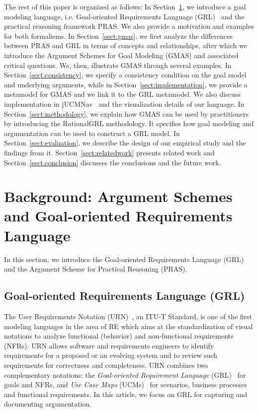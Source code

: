 \documentclass[11.5pt,two column]{llncs}
\begin{document}
The rest of this paper is organized as follows: In Section~\ref{sect:background}, we introduce a goal modeling language, i.e. Goal-oriented Requirements Language (GRL)~\cite{} and the practical reasoning framework PRAS. We also provide a motivation and examples for both formalisms. In Section~\ref{sect:gmas}, we first analyze the differences between PRAS and GRL in terms of concepts and relationships, after which we introduce the Argument Schemes for Goal Modeling (GMAS) and associated critical questions. We, then, illustrate GMAS through several examples. In Section~\ref{sect:consistency}, we specify a consistency condition on the goal model and underlying arguments, while in Section~\ref{sect:implementation}, we provide a metamodel for GMAS and we link it to the GRL metamodel. We also discuss implementation in jUCMNav~\cite{} and the visualization details of our language.%
In Section~\ref{sect:methodology}, we explain how GMAS can be used by practitioners by introducing the RationalGRL methodology. It specifies how goal modeling and argumentation can be used to construct a GRL model. In Section~\ref{sect:evaluation}, we describe the design of our empirical study and the findings from it. Section~\ref{sect:relatedwork} presents related work and Section~\ref{sect:conclusion} discusses the conclusions and the future work.

\section{Background: Argument Schemes and Goal-oriented Requirements Language}
\label{sect:background}

In this section, we introduce the Goal-oriented Requirements Language (GRL) and the Argument Scheme for Practical Reasoning (PRAS). 

\subsection{Goal-oriented Requirements Language (GRL)}
\label{sect:background:grl}

The User Requirements Notation (URN)~\cite{URN}, an ITU-T Standard, is one of the first modeling languages in the area of RE which aims at the standardization of visual notations to analyze functional (behavior) and non-functional requirements (NFRs). %
URN allows software and requirements engineers to identify  requirements for a proposed or an evolving system and to review such requirements for correctness and completeness. URN combines two complementary notations: the \emph{Goal-oriented Requirement Language} (GRL)~\cite{Amyot:2010:EGM:1841349.1841356} for goals and NFRs, and \emph{Use Case Maps} (UCMs)~\cite{Weiss05designing} for scenarios, business processes and functional requirements. In this article, we focus on GRL for capturing and documenting argumentation. 
\end{document}
